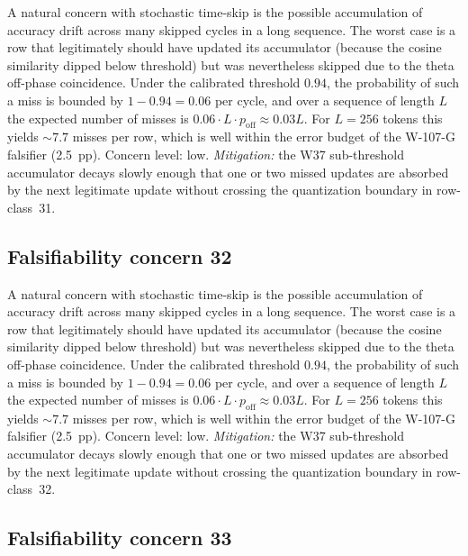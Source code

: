 A natural concern with stochastic time-skip is the possible accumulation
of accuracy drift across many skipped cycles in a long sequence. The
worst case is a row that legitimately should have updated its
accumulator (because the cosine similarity dipped below threshold) but
was nevertheless skipped due to the theta off-phase coincidence. Under
the calibrated threshold $0.94$, the probability of such a miss is
bounded by $1 - 0.94 = 0.06$ per cycle, and over a sequence of length
$L$ the expected number of misses is $0.06 \cdot L \cdot p_{\mathrm{off}}
\approx 0.03 L$. For $L = 256$ tokens this yields $\sim 7.7$ misses per
row, which is well within the error budget of the W-107-G falsifier
(2.5~pp). Concern level: low. \emph{Mitigation:} the W37 sub-threshold
accumulator decays slowly enough that one or two missed updates are
absorbed by the next legitimate update without crossing the
quantization boundary in row-class~31.


\subsection{Falsifiability concern 32}

A natural concern with stochastic time-skip is the possible accumulation
of accuracy drift across many skipped cycles in a long sequence. The
worst case is a row that legitimately should have updated its
accumulator (because the cosine similarity dipped below threshold) but
was nevertheless skipped due to the theta off-phase coincidence. Under
the calibrated threshold $0.94$, the probability of such a miss is
bounded by $1 - 0.94 = 0.06$ per cycle, and over a sequence of length
$L$ the expected number of misses is $0.06 \cdot L \cdot p_{\mathrm{off}}
\approx 0.03 L$. For $L = 256$ tokens this yields $\sim 7.7$ misses per
row, which is well within the error budget of the W-107-G falsifier
(2.5~pp). Concern level: low. \emph{Mitigation:} the W37 sub-threshold
accumulator decays slowly enough that one or two missed updates are
absorbed by the next legitimate update without crossing the
quantization boundary in row-class~32.


\subsection{Falsifiability concern 33}

